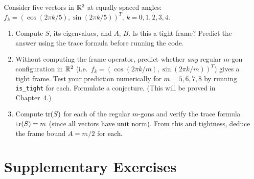 \begin{exercisebox}[title={Lab Exercise 3.6 (Optional, Challenge): Pentagonal Frame}]
Consider five vectors in $\mathbb{R}^2$ at equally spaced angles:
$f_k = (\cos(2\pi k/5), \sin(2\pi k/5))^T$, $k=0,1,2,3,4$.
\begin{enumerate}[label=(\alph*)]
  \item Compute $S$, its eigenvalues, and $A$, $B$. Is this a tight
        frame? Predict the answer using the trace formula before running
        the code.
  \item Without computing the frame operator, predict whether
        \emph{any} regular $m$-gon configuration in $\mathbb{R}^2$ (i.e.\
        $f_k=(\cos(2\pi k/m),\sin(2\pi k/m))^T$) gives a tight frame.
        Test your prediction numerically for $m=5,6,7,8$ by running
        \texttt{is\_tight} for each. Formulate a conjecture. (This will
        be proved in Chapter~4.)
  \item Compute $\operatorname{tr}(S)$ for each of the regular $m$-gons and verify
        the trace formula $\operatorname{tr}(S) = m$ (since all vectors have unit
        norm). From this and tightness, deduce the frame bound $A = m/2$
        for each.
\end{enumerate}
\end{exercisebox}

\newpage
\section{Supplementary Exercises}
\label{sec:extra-ch3}

